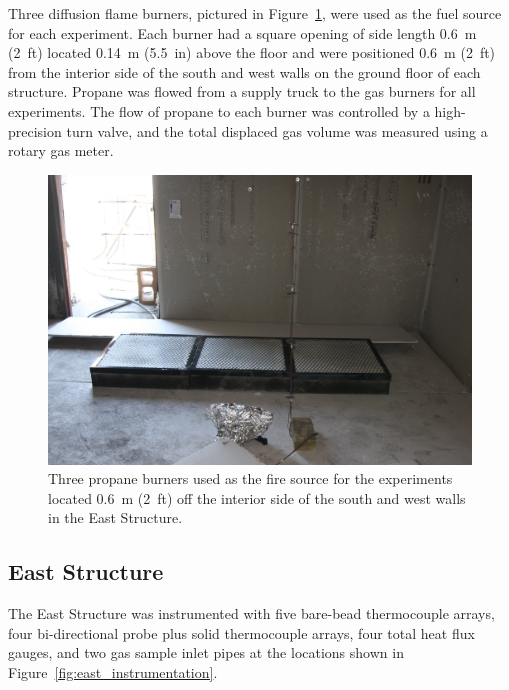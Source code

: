 Three diffusion flame burners, pictured in Figure~\ref{fig:burners}, were used as the fuel source for each experiment. Each burner had a square opening of side length 0.6~m (2~ft) located 0.14~m (5.5~in) above the floor and were positioned 0.6~m (2~ft) from the interior side of the south and west walls on the ground floor of each structure. Propane was flowed from a supply truck to the gas burners for all experiments. The flow of propane to each burner was controlled by a high-precision turn valve, and the total displaced gas volume was measured using a rotary gas meter.

\begin{figure}[!h]
	\centering
	\includegraphics[width=0.9\columnwidth]{Figures/Pictures/burners}
	\caption[Three propane burners used as the fuel source.]{Three propane burners used as the fire source for the experiments located 0.6~m (2~ft) off the interior side of the south and west walls in the East Structure.}
	\label{fig:burners}
\end{figure}
\FloatBarrier

\subsection{East Structure}
The East Structure was instrumented with five bare-bead thermocouple arrays, four bi-directional probe plus solid thermocouple arrays, four total heat flux gauges, and two gas sample inlet pipes at the locations shown in Figure~\ref{fig:east_instrumentation}.

